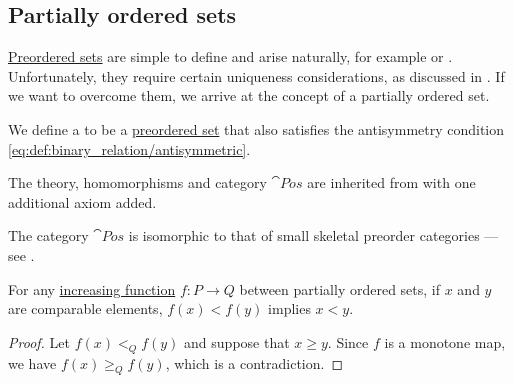 \subsection{Partially ordered sets}\label{subsec:partially_ordered_sets}

\hyperref[def:preordered_set]{Preordered sets} are simple to define and arise naturally, for example  or . Unfortunately, they require certain uniqueness considerations, as discussed in . If we want to overcome them, we arrive at the concept of a partially ordered set.

\begin{definition}\label{def:partially_ordered_set}
  We define a  to be a \hyperref[def:preordered_set]{preordered set} that also satisfies the antisymmetry condition \eqref{eq:def:binary_relation/antisymmetric}.

  The theory, homomorphisms and category \( \cat{Pos} \) are inherited from  with one additional axiom added.
\end{definition}
\begin{comments}
  \item The category \( \cat{Pos} \) is isomorphic to that of small skeletal preorder categories --- see .
\end{comments}

\begin{proposition}\label{thm:comparables_reflect_inequalities}
  For any \hyperref[def:order_homomorphism/increasing]{increasing function} \( f: P \to Q \) between partially ordered sets, if \( x \) and \( y \) are comparable elements, \( f(x) < f(y) \) implies \( x < y \).
\end{proposition}
\begin{proof}
  Let \( f(x) <_Q f(y) \) and suppose that \( x \geq y \). Since \( f \) is a monotone map, we have \( f(x) \geq_Q f(y) \), which is a contradiction.
\end{proof}

